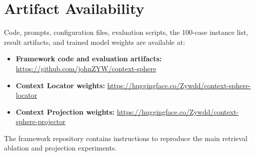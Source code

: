 \section*{Artifact Availability}
\enlargethispage{3pt}

Code, prompts, configuration files, evaluation scripts, the 100-case instance list, result artifacts, and trained model weights are available at:

\begin{itemize}
    \item \textbf{Framework code and evaluation artifacts:} \url{https://github.com/johnZYW/context-sphere}
    \item \textbf{Context Locator weights:} \url{https://huggingface.co/Zywdd/context-sphere-locator}
    \item \textbf{Context Projection weights:} \url{https://huggingface.co/Zywdd/context-sphere-projector}
\end{itemize}

The framework repository contains instructions to reproduce the main retrieval ablation and projection experiments.
